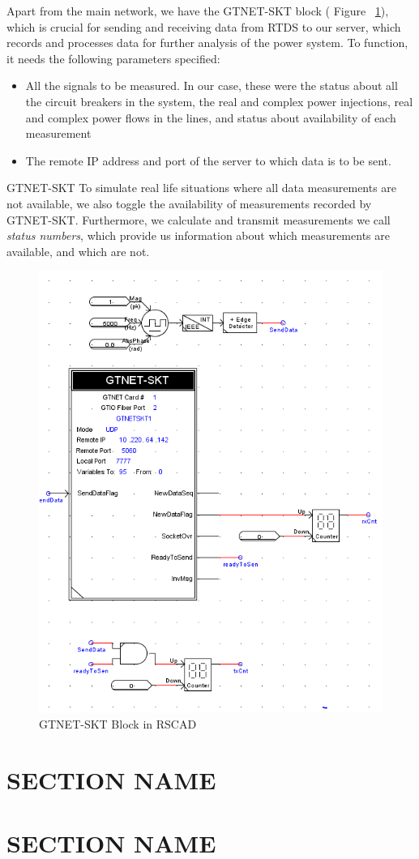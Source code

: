 Apart from the main network, we have the GTNET-SKT block ( Figure ~\ref{fig:skt}), which is crucial for sending and receiving data from RTDS to our server, which records and processes data for further analysis of the power system.  To function, it needs the following parameters specified:
\begin{itemize}
\item All the signals to be measured. In our case, these were the status about all the circuit breakers in the system, the real and complex power injections, real and complex power flows in the lines, and status about availability of each measurement
\item The remote IP address and port of the server to which data is to be sent. 
\end{itemize}
GTNET-SKT 
To simulate real life situations where all data measurements are not available, we also toggle the availability of measurements recorded by GTNET-SKT. Furthermore, we calculate and transmit measurements we call \emph{status numbers}, which provide us information about which measurements are available, and which are not.
\begin{figure}[h]
\includegraphics[width=\textwidth]{Figures/skt.png}
\caption{GTNET-SKT Block in RSCAD}\label{fig:skt}
\end{figure}



\section{SECTION NAME}
\lipsum[3]

\section{SECTION NAME}
\lipsum[2]